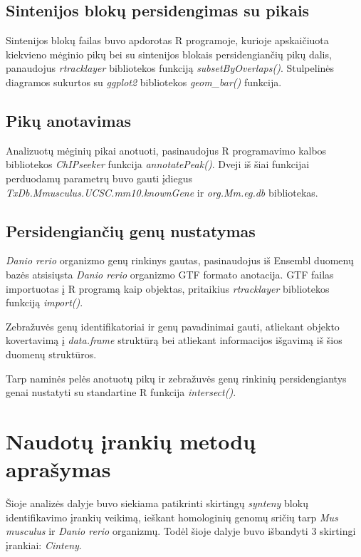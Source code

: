 \documentclass[12pt]{article}
\begin{document}
\subsection{Sintenijos blokų persidengimas su pikais}
Sintenijos blokų failas buvo apdorotas R programoje, kurioje apskaičiuota
kiekvieno mėginio pikų bei su sintenijos blokais persidengiančių pikų dalis,
panaudojus \emph{rtracklayer}\cite{R_TRACK} bibliotekos funkciją
\emph{subsetByOverlaps()}. Stulpelinės diagramos sukurtos su
\emph{ggplot2}\cite{R_GGPLOT} bibliotekos \emph{geom\_bar()} funkcija.

\subsection{Pikų anotavimas}
Analizuotų mėginių pikai anotuoti, pasinaudojus R programavimo kalbos
bibliotekos \emph{ChIPseeker}\cite{CHIP1, CHIP2} funkcija
\emph{annotatePeak()}. Dveji iš šiai funkcijai perduodamų parametrų buvo gauti
įdiegus \emph{TxDb.Mmusculus.UCSC.mm10.knownGene}\cite{KNOWN_GENE}
ir \emph{org.Mm.eg.db}\cite{MM_ANNOT} bibliotekas.

\subsection{Persidengiančių genų nustatymas}
\emph{Danio rerio} organizmo genų rinkinys gautas, pasinaudojus iš
Ensembl\cite{ENSEMBL} duomenų bazės atsisiųsta \emph{Danio rerio}
organizmo GTF formato anotacija. GTF failas importuotas į R programą
kaip objektas, pritaikius \emph{rtracklayer}\cite{R_TRACK} bibliotekos funkciją
\emph{import()}.

Zebražuvės genų identifikatoriai ir genų pavadinimai gauti, atliekant objekto
kovertavimą į \emph{data.frame} struktūrą bei atliekant informacijos išgavimą
iš šios duomenų struktūros.

Tarp naminės pelės anotuotų pikų ir zebražuvės genų rinkinių persidengiantys
genai nustatyti su standartine R funkcija \emph{intersect()}.

\newpage


\section{Naudotų įrankių metodų aprašymas}
Šioje analizės dalyje buvo siekiama patikrinti skirtingų \emph{synteny} blokų
identifikavimo įrankių veikimą, ieškant homologinių genomų sričių tarp
\emph{Mus musculus} ir \emph{Danio rerio} organizmų. Todėl šioje dalyje buvo
išbandyti 3 skirtingi įrankiai: \emph{Cinteny}.
\end{document}
